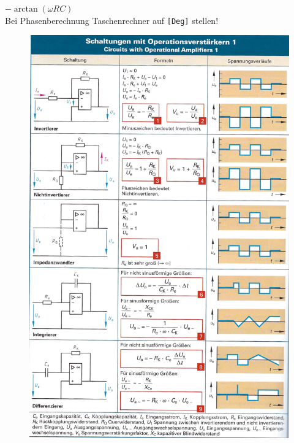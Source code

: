 \documentclass[a5paper, 12pt, twoside]{scrartcl}
\begin{document}
\vspace{1cm}

\dotfill\(-\arctan(\omega RC)\)\\
 Bei Phasenberechnung Taschenrechner auf \texttt{[Deg]} stellen!

\newpage

\begin{figure}[H]
  \centering
  \includegraphics[width=.93\textwidth]{OPV1}
\end{figure}
\end{document}
